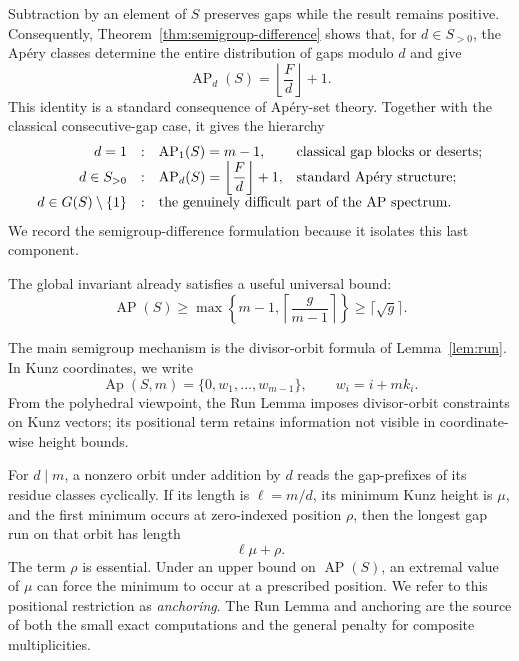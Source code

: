 \documentclass[11pt]{article}
\theoremstyle{plain}
\theoremstyle{definition}
\theoremstyle{remark}
\newcommand{\Ap}{\operatorname{Ap}}
\newcommand{\AP}{\operatorname{AP}}
\begin{document}
Subtraction by an element of $S$ preserves gaps while the result remains
positive.  Consequently, Theorem~\ref{thm:semigroup-difference} shows that,
for $d\in S_{>0}$, the Ap\'ery classes determine the entire distribution of
gaps modulo $d$ and give
\begin{equation}\label{eq:intro-semigroup-difference}
  \AP_d(S)=\left\lfloor\frac Fd\right\rfloor+1.
\end{equation}
This identity is a standard consequence of Ap\'ery-set theory.
Together with the classical consecutive-gap case, it gives the hierarchy
\[
\begin{array}{rcll}
 d=1&:&\AP_1(S)=m-1,
   &\text{classical gap blocks or deserts};\\
 d\in S_{>0}&:&\displaystyle
   \AP_d(S)=\left\lfloor\frac Fd\right\rfloor+1,
   &\text{standard Ap\'ery structure};\\
 d\in G(S)\setminus\{1\}&:&
   \multicolumn{2}{l}{\text{the genuinely difficult part of the AP spectrum}.}
\end{array}
\]
We record the semigroup-difference formulation because it isolates this last
component.

The global invariant already satisfies a useful universal bound:
\begin{equation}\label{eq:intro-universal-bound}
  \AP(S)\geq
  \max\left\{m-1,\left\lceil\frac g{m-1}\right\rceil\right\}
  \geq\lceil\sqrt g\rceil.
\end{equation}

The main semigroup mechanism is the divisor-orbit formula of
Lemma~\ref{lem:run}.  In Kunz coordinates, we write
\[
  \Ap(S,m)=\{0,w_1,\ldots,w_{m-1}\},
  \qquad w_i=i+mk_i.
\]
From the polyhedral viewpoint, the Run Lemma imposes divisor-orbit
constraints on Kunz vectors; its positional term retains information not
visible in coordinate-wise height bounds.

For $d\mid m$, a nonzero orbit under addition by $d$ reads the gap-prefixes
of its residue classes cyclically.  If its length is $\ell=m/d$, its minimum
Kunz height is $\mu$, and the first minimum occurs at zero-indexed position
$\rho$, then the longest gap run on that orbit has length
\begin{equation}\label{eq:intro-run}
  \ell\mu+\rho.
\end{equation}
The term $\rho$ is essential.  Under an upper bound on $\AP(S)$, an extremal
value of $\mu$ can force the minimum to occur at a prescribed position.  We
refer to this positional restriction as \emph{anchoring}.  The Run Lemma and
anchoring are the source of both the small exact computations and the
general penalty for composite multiplicities.
\end{document}
